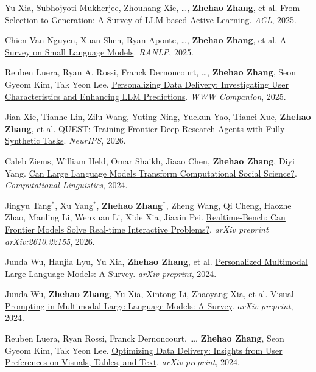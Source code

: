 \documentclass[a4paper,11pt]{article}
\begin{document}
{\begin{enumerate}[leftmargin=*, labelsep=0.5em, align=left, itemindent=0em, label={\textbf{[\arabic*]}}]
\item Yu Xia, Subhojyoti Mukherjee, Zhouhang Xie, \dots, \textbf{Zhehao Zhang}, et al. \href{https://aclanthology.org/2025.acl-long.708/}{From Selection to Generation: A Survey of LLM-based Active Learning}. \textit{ACL}, 2025.

\item Chien Van Nguyen, Xuan Shen, Ryan Aponte, \dots, \textbf{Zhehao Zhang}, et al. \href{https://aclanthology.org/2025.ranlp-1.93/}{A Survey on Small Language Models}. \textit{RANLP}, 2025.

\item Reuben Luera, Ryan A. Rossi, Franck Dernoncourt, \dots, \textbf{Zhehao Zhang}, Seon Gyeom Kim, Tak Yeon Lee. \href{https://dl.acm.org/doi/10.1145/3701716.3715452}{Personalizing Data Delivery: Investigating User Characteristics and Enhancing LLM Predictions}. \textit{WWW Companion}, 2025.

\item Jian Xie, Tianhe Lin, Zilu Wang, Yuting Ning, Yuekun Yao, Tianci Xue, \textbf{Zhehao Zhang}, et al. \href{https://arxiv.org/abs/2605.24218}{QUEST: Training Frontier Deep Research Agents with Fully Synthetic Tasks}. \textit{NeurIPS}, 2026.

\item Caleb Ziems, William Held, Omar Shaikh, Jiaao Chen, \textbf{Zhehao Zhang}, Diyi Yang. \href{https://direct.mit.edu/coli/article/50/1/237/118498}{Can Large Language Models Transform Computational Social Science?}. \textit{Computational Linguistics}, 2024.

\item Jingyu Tang$^*$, Xu Yang$^*$, \textbf{Zhehao Zhang}$^*$, Zheng Wang, Qi Cheng, Haozhe Zhao, Manling Li, Wenxuan Li, Xide Xia, Jiaxin Pei. \href{https://arxiv.org/abs/2610.22155}{Realtime-Bench: Can Frontier Models Solve Real-time Interactive Problems?}. \textit{arXiv preprint arXiv:2610.22155}, 2026.

\item Junda Wu, Hanjia Lyu, Yu Xia, \textbf{Zhehao Zhang}, et al. \href{https://arxiv.org/abs/2412.02142}{Personalized Multimodal Large Language Models: A Survey}. \textit{arXiv preprint}, 2024.

\item Junda Wu, \textbf{Zhehao Zhang}, Yu Xia, Xintong Li, Zhaoyang Xia, et al. \href{https://arxiv.org/abs/2409.15310}{Visual Prompting in Multimodal Large Language Models: A Survey}. \textit{arXiv preprint}, 2024.

\item Reuben Luera, Ryan Rossi, Franck Dernoncourt, \dots, \textbf{Zhehao Zhang}, Seon Gyeom Kim, Tak Yeon Lee. \href{https://arxiv.org/abs/2411.07451}{Optimizing Data Delivery: Insights from User Preferences on Visuals, Tables, and Text}. \textit{arXiv preprint}, 2024.

\end{enumerate}
}
\vspace{-4mm}
\end{document}
